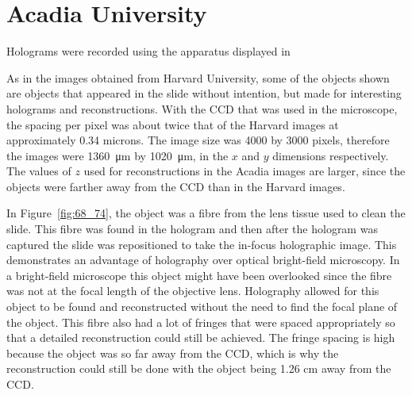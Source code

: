 %
%

\section{Acadia University}


Holograms were recorded using the apparatus displayed in

As in the images obtained from Harvard University, some of the objects shown are
objects that appeared in the slide without intention, but made for interesting
holograms and reconstructions. With the CCD that was used in the microscope,
the spacing per pixel was about twice that of the Harvard images at
approximately 0.34
microns. The image size was 4000 by 3000 pixels, therefore the images were
\SI{1360}{\micro\meter} by \SI{1020}{\micro\meter}, in the $x$ and $y$
dimensions respectively. The values of $z$ used for
reconstructions in the Acadia images are larger, since the objects were farther
away from the CCD than in the Harvard images.

In Figure~\ref{fig:68_74}, the object was a fibre from the lens tissue used to
clean the slide. This fibre was found in the hologram and then after the
hologram was captured the slide was repositioned to take the in-focus
holographic image.
This demonstrates an advantage of holography over optical bright-field
microscopy. In a bright-field microscope this object might have been
overlooked since the fibre was not at the focal length of the objective lens. Holography allowed for
this object to be found and reconstructed without the need to find the focal
plane of the object. This fibre also had a lot of fringes that were spaced
appropriately so that a detailed reconstruction could still be achieved. The
fringe spacing is high because the object was so far away from the CCD, which
is why the reconstruction could still be done with the object being 1.26 cm
away from the CCD.



